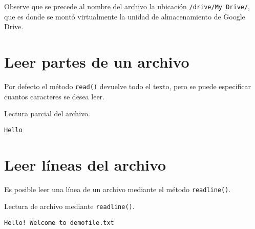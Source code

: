 Observe que se precede al nombre del archivo la ubicación
\texttt{/drive/My\ Drive/}, que es donde se montó virtualmente la unidad
de almacenamiento de Google Drive.

\section{Leer partes de un archivo}

Por defecto el método \texttt{read()} devuelve todo el texto, pero se
puede especificar cuantos caracteres se desea leer.\\

\begin{code} Lectura parcial del archivo.

\begin{Shaded}
\begin{Highlighting}[]
\OperatorTok{=} \NormalTok{(}\NormalTok{, }\NormalTok{)}
\NormalTok{))}
\end{Highlighting}
\end{Shaded}

\begin{verbatim}
Hello
\end{verbatim}
\end{code}

\section{Leer líneas del archivo}
Es posible leer una línea de un archivo mediante el método \texttt{readline()}. \\

\begin{code} Lectura de archivo mediante \texttt{readline()}.
\begin{Shaded}
\begin{Highlighting}[]
\OperatorTok{=} \NormalTok{(}\NormalTok{, }\NormalTok{)}
\end{Highlighting}
\end{Shaded}

\begin{verbatim}
Hello! Welcome to demofile.txt

\end{verbatim}
\end{code}
\begin{Shaded}
\begin{Highlighting}[]
\OperatorTok{=} \NormalTok{(}\NormalTok{, }\NormalTok{)}
\end{Highlighting}
\end{Shaded}

